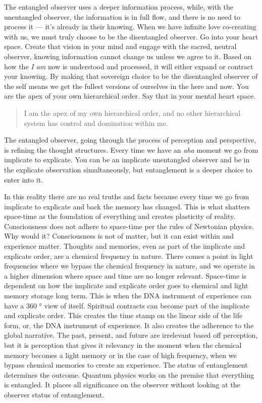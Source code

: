\documentclass[letterpaper,11pt,twoside,titlepage,onecolumn,openany]{book}
\begin{document}
The entangled observer uses a deeper information process, while, with
the unentangled observer, the information is in full flow, and there is
no need to process it --- it's already in their knowing. When we have
infinite love co-creating with us, we must truly choose to be the
disentangled observer. Go into your heart space. Create that vision in
your mind and engage with the sacred, neutral observer, knowing
information cannot change us unless we agree to it. Based on how the
\emph{I am} now is understood and processed, it will either expand or
contract your knowing. By making that sovereign choice to be the
disentangled observer of the self means we get the fullest versions of
ourselves in the here and now. You are the apex of your own hierarchical
order. Say that in your mental heart space.

\begin{quote}
I am the apex of my own hierarchical order, and no other hierarchical
system has control and domination within me.
\end{quote}

The entangled observer, going through the process of perception and
perspective, is refining the thought structures. Every time we have an
\emph{aha} moment we go from implicate to explicate. You can be an
implicate unentangled observer and be in the explicate observation
simultaneously, but entanglement is a deeper choice to enter into it.

In this reality there are no real truths and facts because every time we
go from implicate to explicate and back the memory has changed. This is
what shatters space-time as the foundation of everything and creates
plasticity of reality. Consciousness does not adhere to space-time per
the rules of Newtonian physics. Why would it? Consciousness is not of
matter, but it can exist within and experience matter. Thoughts and
memories, even as part of the implicate and explicate order, are a
chemical frequency in nature. There comes a point in light frequencies
where we bypass the chemical frequency in nature, and we operate in a
higher dimension where space and time are no longer relevant. Space-time
is dependent on how the implicate and explicate order goes to chemical
and light memory storage long term. This is when the DNA instrument of
experience can have a 360 ° view of itself. Spiritual contracts can
become part of the implicate and explicate order. This creates the time
stamp on the linear side of the life form, or, the DNA instrument of
experience. It also creates the adherence to the global narrative. The
past, present, and future are irrelevant based off perception, but it is
perception that gives it relevancy in the moment when the chemical
memory becomes a light memory or in the case of high frequency, when we
bypass chemical memories to create an experience. The status of
entanglement determines the outcome. Quantum physics works on the
premise that everything is entangled. It places all significance on the
observer without looking at the observer status of entanglement.
\end{document}
